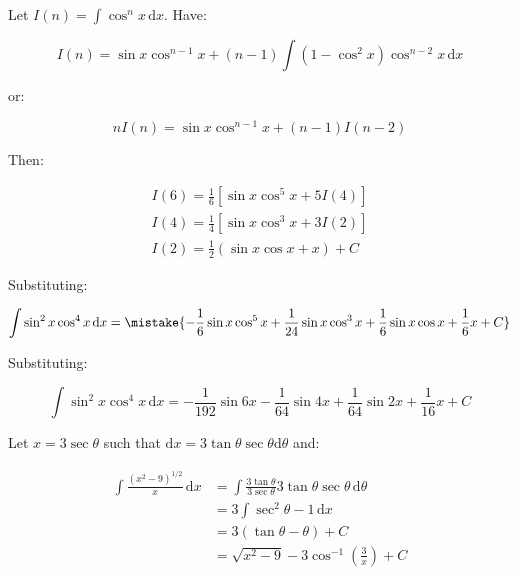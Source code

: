 \documentclass[12pt]{article}
\begin{document}
Let $I(n) = \int \cos^{n}{x} \, \mathrm{d}x$. Have:

\begin{equation}
    I(n) = \sin{x} \cos^{n-1}{x} + (n - 1) \int (1 - \cos^{2}{x}) \cos^{n - 2}{x} \, \mathrm{d}x
\end{equation}

or:

\begin{equation}
    nI(n) = \sin{x} \cos^{n-1}{x} + (n - 1)I(n - 2)
\end{equation}

Then:

\begin{equation}
    \begin{split}
        I(6) = \frac{1}{6} \left[ \sin{x} \cos^{5}{x} + 5I(4) \right] \\
        I(4) = \frac{1}{4} \left[ \sin{x} \cos^{3}{x} + 3I(2) \right] \\
        I(2) = \frac{1}{2} (\sin{x} \cos{x} + x) + C
    \end{split}
\end{equation}

Substituting:

\begin{equation}
    \int \sin^{2}{x} \cos^{4}{x} \, \mathrm{d}x = \mistake{-\frac{1}{6} \sin{x} \cos^{5}{x} + \frac{1}{24} \sin{x} \cos^{3}{x} + \frac{1}{6} \sin{x} \cos{x} + \frac{1}{6} x + C}
\end{equation}

\begin{correction}
    Substituting:

    \begin{equation}
        \int \sin^{2}{x} \cos^{4}{x} \, \mathrm{d}x = -\frac{1}{192} \sin{6x} - \frac{1}{64} \sin{4x} + \frac{1}{64} \sin{2x} + \frac{1}{16} x + C
    \end{equation}
\end{correction}


Let $x = 3\sec{\theta}$ such that $\mathrm{d}x = 3\tan{\theta} \sec{\theta} \mathrm{d}\theta$ and:

\begin{equation}
    \begin{split}
        \int \frac{(x^{2} - 9)^{1/2}}{x} \, \mathrm{d}x &= \int \frac{3\tan{\theta}}{3\sec{\theta}} 3\tan{\theta} \sec{\theta} \, \mathrm{d}\theta \\
        &= 3 \int \sec^{2}{\theta} - 1 \, \mathrm{d}x \\
        &= 3 (\tan{\theta} - \theta) + C \\
        &= \sqrt{x^{2} - 9} - 3 \cos^{-1}{\left( \frac{3}{x} \right)} + C
    \end{split}
\end{equation}
\end{document}
